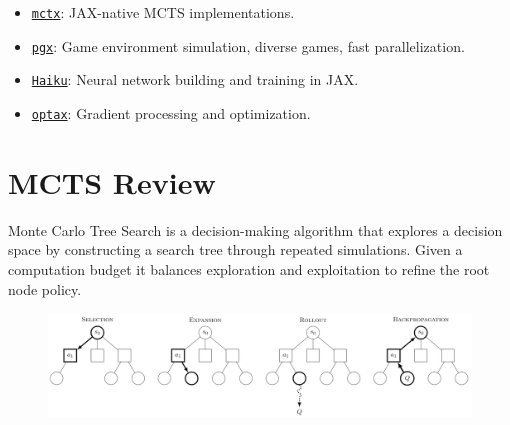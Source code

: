 \documentclass[aspectratio=169,xcolor=dvipsnames]{beamer}
\begin{document}


\begin{frame}{}
\begin{itemize}
    \item \href{https://github.com/google-deepmind/mctx}{\texttt{mctx}}: JAX-native MCTS implementations.
    \item \href{https://github.com/sotetsuk/pgx}{\texttt{pgx}}: Game environment simulation, diverse games, fast parallelization.
    \item \href{https://github.com/google-deepmind/dm-haiku}{\texttt{Haiku}}: Neural network building and training in JAX.
    \item \href{https://github.com/deepmind/optax}{\texttt{optax}}: Gradient processing and optimization.
\end{itemize}
\end{frame}


\section{MCTS Review}


\begin{frame}{}
\vspace{1.5em}
Monte Carlo Tree Search is a decision-making algorithm that explores a decision space by constructing a search tree through repeated simulations. Given a computation budget it balances exploration and exploitation to refine the root node policy.

\vspace{2.5em}

\begin{figure}[h]
    \centering
    \includegraphics[width=1.0\textwidth]{mcts.png}
    \label{fig:intro}
\end{figure}
\end{frame}
\end{document}
